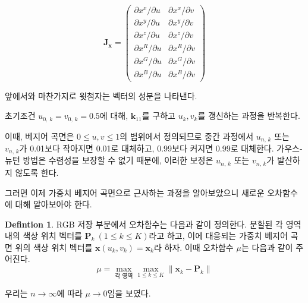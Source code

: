 \documentclass{gshs_thesis}
\theoremstyle{theorem}
\theoremstyle{lemma}
\theoremstyle{definition}
\newtheorem{definition}[theorem]{Defintion}
\begin{document}
$$ \mathbf{J}_\mathbf{x} = \begin{pmatrix} \partial x^x / \partial u & \partial x^x / \partial v \\ \partial x^y / \partial u & \partial x^y / \partial v \\ \partial x^z / \partial u & \partial x^z / \partial v \\ \partial x^R / \partial u & \partial x^R / \partial v \\ \partial x^G / \partial u & \partial x^G / \partial v \\ \partial x^B / \partial u & \partial x^B / \partial v \end{pmatrix} $$ 

앞에서와 마찬가지로 윗첨자는 벡터의 성분을 나타낸다.

초기조건 $u_{0, \, k} = v_{0, \, k} = 0.5$에 대해, $\mathbf{k}_{11}$를 구하고 $u_k, v_k$를 갱신하는 과정을 반복한다. 

이때, 베지어 곡면은 $0 \leq u, v \leq 1$의 범위에서 정의되므로 중간 과정에서 $u_{n, \, k}$ 또는 $v_{n, \, k}$가 0.01보다 작아지면 0.01로 대체하고, 0.99보다 커지면 0.99로 대체한다. 가우스-뉴턴 방법은 수렴성을 보장할 수 없기 때문에, 이러한 보정은 $u_{n, \, k}$ 또는 $v_{n, \, k}$가 발산하지 않도록 한다.

그러면 이제 가중치 베지어 곡면으로 근사하는 과정을 알아보았으니 새로운 오차함수에 대해 알아보아야 한다.
\begin{definition}
	RGB 저장 부분에서 오차함수는 다음과 같이 정의한다. 분할된 각 영역 내의 색상 위치 벡터를 $\mathbf{P}_k\ (1\leq k\leq K)$라고 하고, 이에 대응되는 가중치 베지어 곡면 위의 색상 위치 벡터를 $\mathbf{x}(u_k, v_k)=\mathbf{x}_k$라 하자. 이때 오차함수 $\mu$는 다음과 같이 주어진다.
	\begin{equation} \label{error}
		\mu=\max_{\text{각 영역}}\max_{1\leq k\leq K} \| \mathbf{x}_k-\mathbf{P}_k \|
	\end{equation}
\end{definition}
우리는 $n\to\infty$에 따라 $\mu\to0$임을 보였다. 
\end{document}

